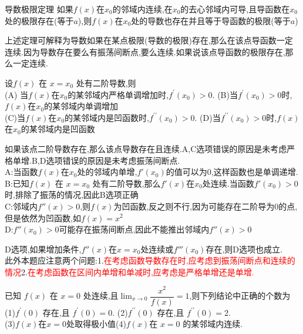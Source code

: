 \documentclass[8pt a4paper, oneside, UTF8]{ctexbook}  %
\begin{document}
\begin{sloppypar}
\begin{note}
    \end{note}
    \begin{them}{导数极限定理}{}\label{dsjxdl}
        如果$f(x)$在$x_0$的邻域内连续,在$x_{0}$的去心邻域内可导,且导函数在$x_{0}$处的极限存在(等于$a$),则$f(x)$在$x_0$处的导数也存在并且等于导函数的极限(等于$a$)
    \end{them}
    上述定理可解释为导数如果在某点极限(导数的极限)存在,那么在该点导函数一定连续.因为导数存在要么有振荡间断点,要么连续.如果说该点导函数的极限存在,那么一定连续.
    \begin{problem}
    设$f(x)$ 在 $x=x_0$ 处有二阶导数,则\\
    (A) 当$f(x)$在$x_0$的某邻域内严格单调增加时,$f^\prime(x_0)>0.$
    (B)当$f^\prime(x_0)>0$时,$f(x)$在$x_0$的某邻域内单调增加\\
    (C)当$f(x)$在$x_0$的某邻域内是凹函数时,$f^{\prime\prime}(x_0)>0.$
    (D)当$f^{\prime\prime}(x_0)>0$时,$f(x)$在$x_0$的某邻域内是凹函数
    \end{problem}
    \begin{solution}
        如果该点二阶导数存在,那么该点导数存在且连续.A,C选项错误的原因是未考虑严格单增.B,D选项错误的原因是未考虑振荡间断点.\\
        A:当函数$f(x)$在$x_0$处的邻域内单增,$f'(x_0)$的值可以为0,这样函数也是单调递增.\\
        B:已知$f(x)$ 在 $x=x_0$ 处有二阶导数,那么$f'(x)$在$x_0$处连续.当函数$f'(x_0)>0$时,排除了振荡的情况,因此B选项正确\\
        C:邻域内$f''(x)>0$,则$f(x)$为凹函数,反之则不行,因为可能存在二阶导为0的点,但是依然为凹函数,如$f(x)=x^2$\\
        D:$f''(x_0)>0$可能存在振荡间断点,因此不能推出邻域内$f''(x)>0$
    \end{solution}
    \begin{note}
        D选项,如果增加条件,$f''(x)$在$x=x_0$处连续或$f'''(x_0)$存在,则D选项也成立.\\此外本题应注意两个问题:1.\textcolor{red}{在考虑函数导数存在时,应考虑到振荡间断点和连续的情况}2.\textcolor{red}{在考虑函数在区间内单增和单减时,应考虑是严格单增还是单增.}
    \end{note}
    \begin{problem}
    已知 $f(x)$ 在 $x=0$ 处连续,且$\lim_{x\to 0}\dfrac{x^2}{f(x)}=1$,则下列结论中正确的个数为\\
    (1)$f^{\prime}(0)$ 存在,且 $f^\prime(0)=0.$ \quad (2)$f^{\prime\prime}(0)$ 存在,且 $f^{\prime\prime}(0)=2.$\\
    (3)$f(x)$在$x=0$处取得极小值\quad (4)$f\left(x\right)$在 $x=0$ 的某邻域内连续.

\end{problem}
\end{sloppypar}
\end{document}
